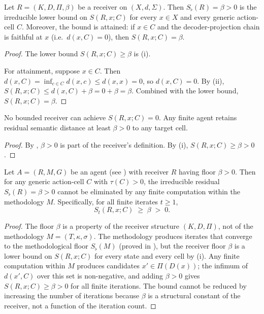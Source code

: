 \documentclass[twocolumn,11pt,a4paper]{article}
\newcommand{\Sfloor}{S_{\flat}}
\begin{document}
\begin{theorem}
\label{thm:floor}
Let $R=(K,D,\Pi,\beta)$ be a receiver on $(X,d,\Sigma)$.  Then
$\Sfloor(R)=\beta>0$ is the irreducible lower bound on $S(R,x;C)$
for every $x\in X$ and every generic action-cell $C$.  Moreover, the
bound is attained: if $x\in C$ and the decoder-projection chain is
faithful at $x$ (i.e.\ $d(x,C)=0$), then $S(R,x;C)=\beta$.
\end{theorem}

\begin{proof}
The lower bound $S(R,x;C)\geq\beta$ is (i).

For attainment, suppose $x\in C$.  Then $d(x,C)=\inf_{c\in C}d(x,c)
\leq d(x,x)=0$, so $d(x,C)=0$.  By (ii),
$S(R,x;C)\leq d(x,C)+\beta=0+\beta=\beta$.  Combined with the lower
bound, $S(R,x;C)=\beta$.
\end{proof}

\begin{corollary}
\label{cor:noperfectprecision}
No bounded receiver can achieve $S(R,x;C)=0$.  Any finite agent retains
residual semantic distance at least $\beta>0$ to any target cell.
\end{corollary}

\begin{proof}
By , $\beta>0$ is part of the receiver's definition.
By (i), $S(R,x;C)\geq\beta>0$.
\end{proof}

\begin{theorem}
\label{thm:boundedrationalitytheorem}
Let $A=(R,M,G)$ be an agent (see ) with receiver $R$
having floor $\beta>0$.  Then for any generic action-cell $C$ with
$\tau(C)>0$, the irreducible residual $\Sfloor(R)=\beta>0$ cannot be
eliminated by any finite computation within the methodology $M$.
Specifically, for all finite iterates $t\geq 1$,
\[
  S_t(R,x;C)\;\geq\;\beta\;>\;0.
\]
\end{theorem}

\begin{proof}
The floor $\beta$ is a property of the receiver structure $(K,D,\Pi)$,
not of the methodology $M=(T,\kappa,\sigma)$.  The methodology produces
iterates that converge to the methodological floor $\Sfloor(M)$ (proved
in ), but the receiver floor $\beta$ is a lower bound
on $S(R,x;C)$ for every state and every cell by
(i).  Any finite computation within $M$ produces
candidates $x'\in\Pi(D(x))$; the infimum of $d(x',C)$ over this set is
non-negative, and adding $\beta>0$ gives $S(R,x;C)\geq\beta>0$ for all
finite iterations.  The bound cannot be reduced by increasing the number
of iterations because $\beta$ is a structural constant of the receiver,
not a function of the iteration count.
\end{proof}
\end{document}
